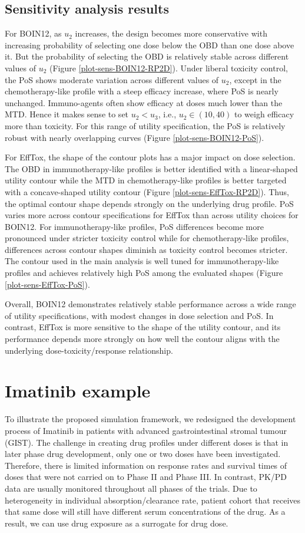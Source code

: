 \documentclass[11pt]{article}
\begin{document}
\subsection{Sensitivity analysis results}
For BOIN12, as $u_2$ increases, the design becomes more conservative with increasing probability of selecting one dose below the OBD than one dose above it. But the probability of selecting the OBD is relatively stable across different values of $u_2$ (Figure \ref{plot-sens-BOIN12-RP2D}). Under liberal toxicity control, the PoS shows moderate variation across different values of $u_2$, except in the chemotherapy-like profile with a steep efficacy increase, where PoS is nearly unchanged. Immuno-agents often show efficacy at doses much lower than the MTD. Hence it makes sense to set $u_2 < u_3$, i.e., $u_2 \in (10,40)$ to weigh efficacy more than toxicity. For this range of utility specification, the PoS is relatively robust with nearly overlapping curves (Figure \ref{plot-sens-BOIN12-PoS}). 

For EffTox, the shape of the contour plots has a major impact on dose selection. The OBD in immunotherapy-like profiles is better identified with a linear-shaped utility contour while the MTD in chemotherapy-like profiles is better targeted with a concave-shaped utility contour (Figure \ref{plot-sens-EffTox-RP2D}). Thus, the optimal contour shape depends strongly on the underlying drug profile. PoS varies more across contour specifications for EffTox than across utility choices for BOIN12. For immunotherapy-like profiles, PoS differences become more pronounced under stricter toxicity control while for chemotherapy-like profiles, differences across contour shapes diminish as toxicity control becomes stricter. The contour used in the main analysis is well tuned for immunotherapy-like profiles and achieves relatively high PoS among the evaluated shapes (Figure \ref{plot-sens-EffTox-PoS}). 

Overall, BOIN12 demonstrates relatively stable performance across a wide range of utility specifications, with modest changes in dose selection and PoS. In contrast, EffTox is more sensitive to the shape of the utility contour, and its performance depends more strongly on how well the contour aligns with the underlying dose-toxicity/response relationship.

\section{Imatinib example}
To illustrate the proposed simulation framework, we redesigned the development process of Imatinib in patients with advanced gastrointestinal stromal tumour (GIST). The challenge in creating drug profiles under different doses is that in later phase drug development, only one or two doses have been investigated. Therefore, there is limited information on response rates and survival times of doses that were not carried on to Phase II and Phase III. In contrast, PK/PD data are usually monitored throughout all phases of the trials. Due to heterogeneity in individual absorption/clearance rate, patient cohort that receives that same dose will still have different serum concentrations of the drug. As a result, we can use drug exposure as a surrogate for drug dose. 
\end{document}
